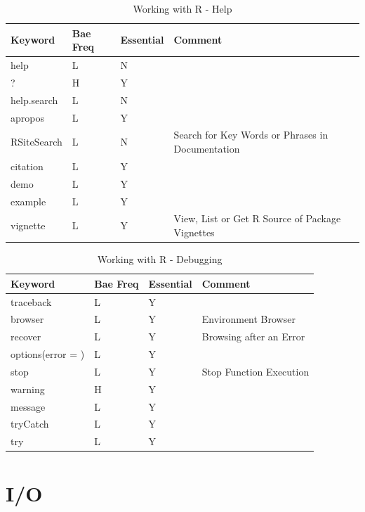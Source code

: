 \documentclass[10pt,]{krantz}
\theoremstyle{definition}
\theoremstyle{definition}
\theoremstyle{remark}
\begin{document}
\begin{table}

\caption{\label{tab:knitchunk22}Working with R - Help}
\centering
\begin{tabular}[t]{llll}
\toprule
Keyword & Bae Freq & Essential & Comment\\
\midrule
help & L & N & \\
? & H & Y & \\
help.search & L & N & \\
apropos & L & Y & \\
RSiteSearch & L & N & Search for Key Words or Phrases in Documentation\\
\addlinespace
citation & L & Y & \\
demo & L & Y & \\
example & L & Y & \\
vignette & L & Y & View, List or Get R Source of Package Vignettes\\
\bottomrule
\end{tabular}
\end{table}

\begin{table}

\caption{\label{tab:knitchunk23}Working with R - Debugging}
\centering
\begin{tabular}[t]{llll}
\toprule
Keyword & Bae Freq & Essential & Comment\\
\midrule
traceback & L & Y & \\
browser & L & Y & Environment Browser\\
recover & L & Y & Browsing after an Error\\
options(error = ) & L & Y & \\
stop & L & Y & Stop Function Execution\\
\addlinespace
warning & H & Y & \\
message & L & Y & \\
tryCatch & L & Y & \\
try & L & Y & \\
\bottomrule
\end{tabular}
\end{table}

\section{I/O}\label{io}
\end{document}
